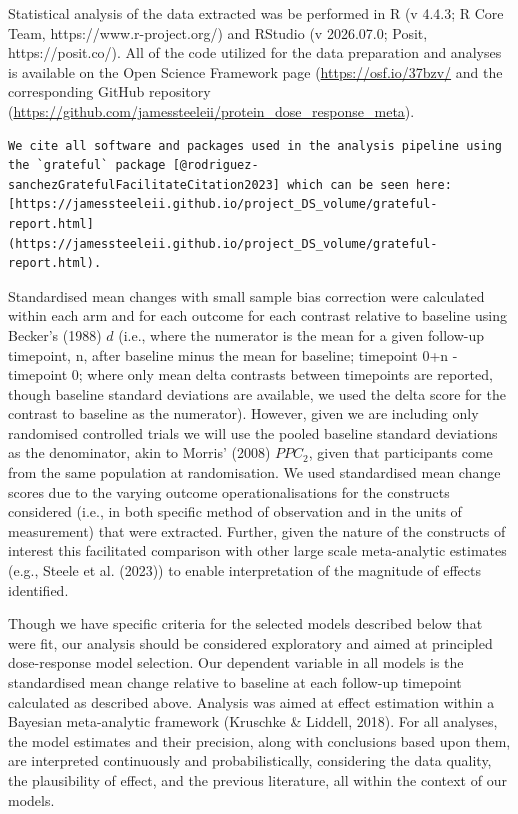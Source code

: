 \documentclass[
]{article}
\begin{document}
Statistical analysis of the data extracted was be performed in R (v
4.4.3; R Core Team, https://www.r-project.org/) and RStudio (v
2026.07.0; Posit, https://posit.co/). All of the code utilized for the
data preparation and analyses is available on the Open Science Framework
page (\url{https://osf.io/37bzv/} and the corresponding GitHub
repository
(\url{https://github.com/jamessteeleii/protein_dose_response_meta}).

\begin{verbatim}
We cite all software and packages used in the analysis pipeline using the `grateful` package [@rodriguez-sanchezGratefulFacilitateCitation2023] which can be seen here: [https://jamessteeleii.github.io/project_DS_volume/grateful-report.html](https://jamessteeleii.github.io/project_DS_volume/grateful-report.html).
\end{verbatim}

Standardised mean changes with small sample bias correction were
calculated within each arm and for each outcome for each contrast
relative to baseline using Becker's (1988) \(d\) (i.e., where the
numerator is the mean for a given follow-up timepoint, n, after baseline
minus the mean for baseline; timepoint 0+n - timepoint 0; where only
mean delta contrasts between timepoints are reported, though baseline
standard deviations are available, we used the delta score for the
contrast to baseline as the numerator). However, given we are including
only randomised controlled trials we will use the pooled baseline
standard deviations as the denominator, akin to Morris' (2008)
\(PPC_2\), given that participants come from the same population at
randomisation. We used standardised mean change scores due to the
varying outcome operationalisations for the constructs considered (i.e.,
in both specific method of observation and in the units of measurement)
that were extracted. Further, given the nature of the constructs of
interest this facilitated comparison with other large scale
meta-analytic estimates (e.g., Steele et al. (2023)) to enable
interpretation of the magnitude of effects identified.

Though we have specific criteria for the selected models described below
that were fit, our analysis should be considered exploratory and aimed
at principled dose-response model selection. Our dependent variable in
all models is the standardised mean change relative to baseline at each
follow-up timepoint calculated as described above. Analysis was aimed at
effect estimation within a Bayesian meta-analytic framework (Kruschke \&
Liddell, 2018). For all analyses, the model estimates and their
precision, along with conclusions based upon them, are interpreted
continuously and probabilistically, considering the data quality, the
plausibility of effect, and the previous literature, all within the
context of our models.
\end{document}
